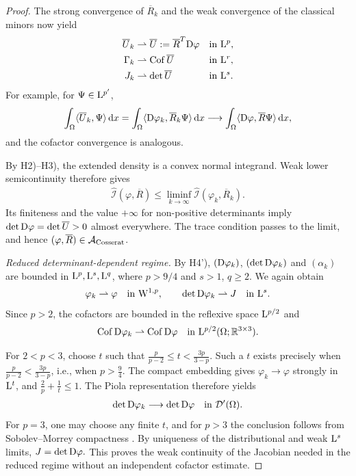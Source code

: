 \documentclass[11pt]{article}
\begin{document}
\begin{proof}
The strong convergence of $ \overline R _k$ and the weak convergence of the classical minors now yield
\begin{align}
\overline U_k&\rightharpoonup \overline U:= \overline R ^T{\rm D}\varphi
&&\text{in }{\rm L}^p,
\notag\\
\Gamma_k&\rightharpoonup\operatorname{Cof}\overline U
&&\text{in }{\rm L}^r,
\notag\\
J_k&\rightharpoonup\det \overline U
&&\text{in }{\rm L}^s.
\end{align}
For example, for $\Psi\in {\rm L}^{p'}$,
\begin{align}
\int_\Omega\langle \overline U_k,\Psi\rangle\,\mathrm dx
=
\int_\Omega\langle{\rm D}\varphi_k, \overline R _k\Psi\rangle\,\mathrm dx
\longrightarrow
\int_\Omega\langle{\rm D}\varphi, \overline R \Psi\rangle\,\mathrm dx,
\end{align}
and the cofactor convergence is analogous.

By H2)--H3), the extended density is a convex normal integrand. Weak lower semicontinuity therefore gives
\begin{align}
\widehat{\mathcal I}(\varphi, \overline R )
\leq
\liminf_{k\to\infty}
\widehat{\mathcal I}(\varphi_k, \overline R _k).
\end{align}
Its finiteness and the value $+\infty$ for non-positive determinants imply
$
\det{\rm D}\varphi=\det \overline U>0
$
almost everywhere. The trace condition passes to the limit, and hence $(\varphi, \overline R )\in\mathcal A_{\rm Cosserat}$.

\medskip
\noindent\emph{Reduced determinant-dependent regime.}
By H4'), $({\rm D}\varphi_k)$, $(\det{\rm D}\varphi_k)$ and $(\alpha_k)$ are bounded in ${\rm L}^p,{\rm L}^s,{\rm L}^q$, where $p>9/4$ and $s>1$, $q\geq 2$. We again obtain
\begin{align}
\varphi_k\rightharpoonup\varphi
\quad\text{in }{\rm W}^{1,p},
\qquad
\det{\rm D}\varphi_k\rightharpoonup J
\quad\text{in }{\rm L}^s.
\end{align}
Since $p>2$, the cofactors are bounded in the reflexive space ${\rm L}^{p/2}$ and
\begin{align}
\operatorname{Cof}{\rm D}\varphi_k
\rightharpoonup
\operatorname{Cof}{\rm D}\varphi
\quad\text{in }{\rm L}^{p/2}(\Omega;\mathbb R^{3\times3}).
\end{align}

For $2<p<3$, choose $t$ such that
$
\frac{p}{p-2}\leq t<\frac{3p}{3-p}.
$
Such a $t$ exists precisely when
$
\frac{p}{p-2}<\frac{3p}{3-p}
$, i.e., when $p>\frac94.
$
The compact embedding gives $\varphi_k\to\varphi$ strongly in ${\rm L}^t$, and
$
\frac 2p+\frac1t\leq1.
$
The Piola representation therefore yields
\begin{align}
\det{\rm D}\varphi_k
\longrightarrow
\det{\rm D}\varphi
\quad\text{in }\mathcal D'(\Omega).
\end{align}
For $p=3$, one may choose any finite $t$, and for $p>3$ the conclusion follows from Sobolev--Morrey compactness \cite{AdamsFournier2003}. By uniqueness of the distributional and weak ${\rm L}^s$ limits,
$
J=\det{\rm D}\varphi.
$
This proves the weak continuity of the Jacobian needed in the reduced regime without an independent cofactor estimate.


\end{proof}
\end{document}
